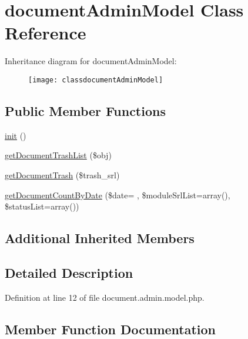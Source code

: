 \hypertarget{classdocumentAdminModel}{}\section{document\+Admin\+Model Class Reference}
\label{classdocumentAdminModel}
Inheritance diagram for document\+Admin\+Model\+:\begin{figure}[H]
\begin{center}
\leavevmode
\texttt{[image: classdocumentAdminModel]}
\end{center}
\end{figure}
\subsection*{Public Member Functions}
\begin{DoxyCompactItemize}
\item 
\hyperlink{classdocumentAdminModel_aa2d2c19a8a236499b03c085bbf578c11}{init} ()
\item 
\hyperlink{classdocumentAdminModel_a2dde1d3304ebc18a52a841aee71b4fad}{get\+Document\+Trash\+List} (\$obj)
\item 
\hyperlink{classdocumentAdminModel_a4cff1ba3f56281a915059ecdbcdfd740}{get\+Document\+Trash} (\$trash\+\_\+srl)
\item 
\hyperlink{classdocumentAdminModel_af678afbc6a4c06e1913f30755a370ab0}{get\+Document\+Count\+By\+Date} (\$date= \textquotesingle{}\textquotesingle{}, \$module\+Srl\+List=array(), \$status\+List=array())
\end{DoxyCompactItemize}
\subsection*{Additional Inherited Members}


\subsection{Detailed Description}


Definition at line 12 of file document.\+admin.\+model.\+php.



\subsection{Member Function Documentation}
\hypertarget{classdocumentAdminModel_af678afbc6a4c06e1913f30755a370ab0}{}

